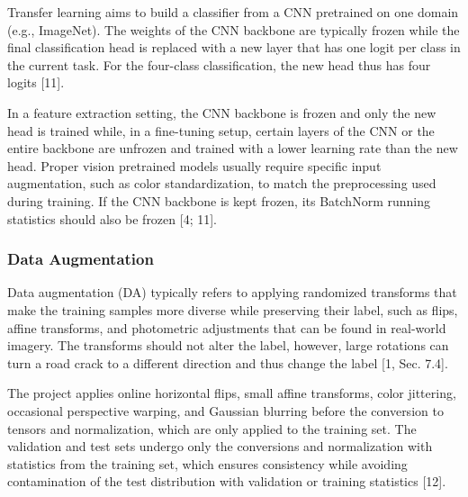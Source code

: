 Transfer learning aims to build a classifier from a CNN pretrained on one domain (e.g., ImageNet). The weights of the CNN backbone are typically frozen while the final classification head is replaced with a new layer that has one logit per class in the current task. For the four-class classification, the new head thus has four logits [11].

In a feature extraction setting, the CNN backbone is frozen and only the new head is trained while, in a fine-tuning setup, certain layers of the CNN or the entire backbone are unfrozen and trained with a lower learning rate than the new head. Proper vision pretrained models usually require specific input augmentation, such as color standardization, to match the preprocessing used during training. If the CNN backbone is kept frozen, its BatchNorm running statistics should also be frozen [4; 11].

\subsubsection{Data Augmentation}\label{theory:2.6.2}

Data augmentation (DA) typically refers to applying randomized transforms that make the training samples more diverse while preserving their label, such as flips, affine transforms, and photometric adjustments that can be found in real-world imagery. The transforms should not alter the label, however, large rotations can turn a road crack to a different direction and thus change the label [1, Sec. 7.4].

The project applies online horizontal flips, small affine transforms, color jittering, occasional perspective warping, and Gaussian blurring before the conversion to tensors and normalization, which are only applied to the training set. The validation and test sets undergo only the conversions and normalization with statistics from the training set, which ensures consistency while avoiding contamination of the test distribution with validation or training statistics [12].

